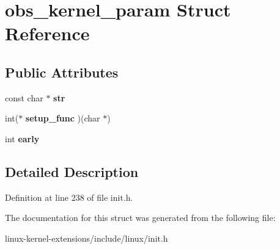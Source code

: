 \hypertarget{structobs__kernel__param}{\section{obs\-\_\-kernel\-\_\-param Struct Reference}
\label{structobs__kernel__param}
}
\subsection*{Public Attributes}
\begin{DoxyCompactItemize}
\item 
\hypertarget{structobs__kernel__param_ab4b78af01e66f4636981401151da19aa}{const char $\ast$ {\bfseries str}}\label{structobs__kernel__param_ab4b78af01e66f4636981401151da19aa}

\item 
\hypertarget{structobs__kernel__param_a4988657d293711e822c13e202290d517}{int($\ast$ {\bfseries setup\-\_\-func} )(char $\ast$)}\label{structobs__kernel__param_a4988657d293711e822c13e202290d517}

\item 
\hypertarget{structobs__kernel__param_a816f3a1d02ab166ba7298b4696369f55}{int {\bfseries early}}\label{structobs__kernel__param_a816f3a1d02ab166ba7298b4696369f55}

\end{DoxyCompactItemize}


\subsection{Detailed Description}


Definition at line 238 of file init.\-h.



The documentation for this struct was generated from the following file\-:\begin{DoxyCompactItemize}
\item 
linux-\/kernel-\/extensions/include/linux/init.\-h\end{DoxyCompactItemize}
